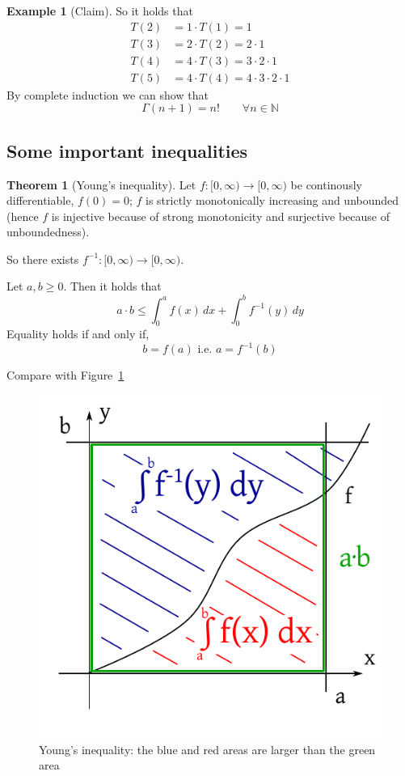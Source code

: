 \documentclass[a4paper,landscape,twocolumn]{article}
\theoremstyle{definition}
\newtheorem{theorem}{Theorem}
\newtheorem{ex}{Example}
\begin{document}
\begin{ex}[Claim]
  So it holds that
  \begin{align*}
    T(2) &= 1 \cdot T(1) = 1 \\
    T(3) &= 2 \cdot T(2) = 2 \cdot 1 \\
    T(4) &= 4 \cdot T(3) = 3 \cdot 2 \cdot 1 \\
    T(5) &= 4 \cdot T(4) = 4 \cdot 3 \cdot 2 \cdot 1
  \end{align*}
  By complete induction we can show that
  \[ \Gamma(n+1) = n! \qquad \forall n \in \mathbb N \]
\end{ex}

\subsection{Some important inequalities}
%
\begin{theorem}[Young's inequality]
  Let $f: [0, \infty) \to [0,\infty)$ be continously differentiable,
  $f(0) = 0$; $f$ is strictly monotonically increasing and unbounded
  (hence $f$ is injective because of strong monotonicity
  and surjective because of unboundedness).

  So there exists $f^{-1}: [0,\infty) \to [0,\infty)$.

  Let $a,b \geq 0$. Then it holds that
  \[ a \cdot b \leq \int_0^a f(x) \, dx + \int_0^b f^{-1}(y) \, dy \]
  Equality holds if and only if,
  \[ b = f(a) \text{ i.e. } a = f^{-1}(b) \]

  Compare with Figure~\ref{img:youngs-ineq}
\end{theorem}
\begin{figure}[!h]
  \begin{center}
    \includegraphics{img/youngs_inequality.pdf}
    \caption{Young's inequality: the blue and red areas are larger than the green area}
    \label{img:youngs-ineq}
  \end{center}
\end{figure}
\end{document}
